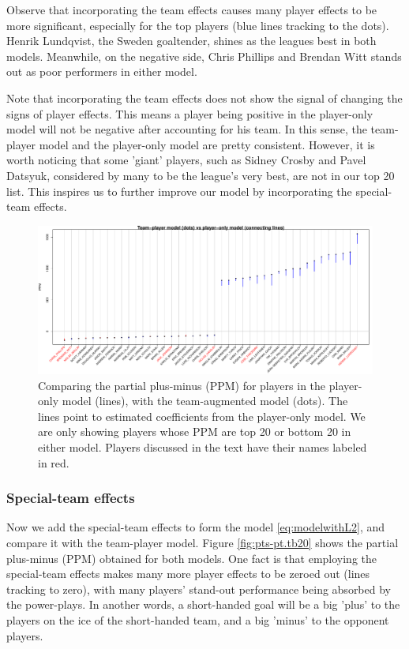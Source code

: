 Observe that incorporating the team effects causes many player effects to be more significant, especially for the top players (blue lines tracking to the dots). Henrik Lundqvist, the Sweden goaltender, shines as the leagues best in both models. Meanwhile, on the negative side, Chris Phillips and Brendan Witt stands out as poor performers in either model. 

Note that incorporating the team effects does not show the signal of changing the signs of player effects. This means a player being positive in the player-only model will not be negative after accounting for his team. In this sense, the team-player model and the player-only model are pretty consistent. However, it is worth noticing that some 'giant' players, such as Sidney Crosby and Pavel Datsyuk, considered by many to be the league's very best, are not in our top 20 list. This inspires us to further improve our model by incorporating the special-team effects. 

\begin{figure}[htb!]
	\centering
	\includegraphics[width=\textwidth]{figures/ptvsp_tb20.pdf}
	\caption{Comparing the partial plus-minus (PPM) for players in the player-only model (lines), with the team-augmented model (dots). The lines point to estimated coefficients from the player-only model. We are only showing players whose PPM are top 20 or bottom 20 in either model. Players discussed in the text have their names labeled in red.}\label{fig:pt-p.tb20}
\end{figure}

\subsubsection{Special-team effects}
Now we add the special-team effects to form the model \eqref{eq:modelwithL2}, and compare it with the team-player model. Figure \ref{fig:pts-pt.tb20} shows the partial plus-minus (PPM) obtained for both models. One fact is that employing the special-team effects makes many more player effects to be zeroed out (lines tracking to zero), with many players' stand-out performance being absorbed by the power-plays. In another words, a short-handed goal will be a big 'plus' to the players on the ice of the short-handed team, and a big 'minus' to the opponent players. 

